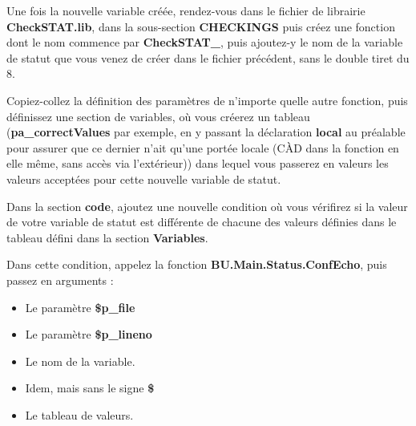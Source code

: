 \documentclass[a4paper,10pt]{article}
\begin{document}
    \begin{justify}
        Une fois la nouvelle variable créée, rendez-vous dans le fichier de librairie \textbf{\color{path}CheckSTAT.lib}, dans la sous-section \textbf{CHECKINGS} puis créez une fonction dont le nom commence par \textbf{\color{mauve}CheckSTAT\_}, puis ajoutez-y le nom de la variable de statut que vous venez de créer dans le fichier précédent, sans le double tiret du 8.
    \end{justify}

    \begin{justify}
        Copiez-collez la définition des paramètres de n'importe quelle autre fonction, puis définissez une section de variables, où vous créerez un tableau (\textbf{pa\_correctValues} par exemple, en y passant la déclaration \textbf{\color{cmds}local} au préalable pour assurer que ce dernier n'ait qu'une portée locale (CÀD dans la fonction en elle même, sans accès via l'extérieur)) dans lequel vous passerez en valeurs les valeurs acceptées pour cette nouvelle variable de statut.
    \end{justify}

    \begin{justify}
        Dans la section \textbf{code}, ajoutez une nouvelle condition où vous vérifirez si la valeur de votre variable de statut est différente de chacune des valeurs définies dans le tableau défini dans la section \textbf{Variables}.
    \end{justify}

    \begin{justify}
        Dans cette condition, appelez la fonction \textbf{\color{mauve}BU.Main.Status.ConfEcho}, puis passez en arguments :

        \begin{itemize}
            \item Le paramètre \textbf{\color{vars}\$p\_file}\\\mbox{}

            \item Le paramètre \textbf{\color{vars}\$p\_lineno}\\\mbox{}

            \item Le nom de la variable.\\\mbox{}

            \item Idem, mais sans le signe \textbf{\$}\\\mbox{}

            \item Le tableau de valeurs.
        \end{itemize}
    \end{justify}
\end{document}

